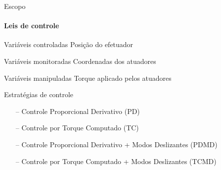 \documentclass[25pt,landscape]{beamer}
\begin{document}
\begin{frame}{Escopo}
    \framesubtitle{Leis de controle}
    \pause
    \begin{block}{Vari\'aveis controladas}
    	Posi\c{c}\~ao do efetuador
    \end{block}
    \pause
    \begin{block}{Vari\'aveis monitoradas}
    	Coordenadas dos atuadores
    \end{block}
    \pause
    \begin{block}{Vari\'aveis manipuladas}
    	Torque aplicado pelos atuadores
    \end{block}
    \pause
   	\begin{block}{Estrat\'egias de controle}
    	\begin{itemize}
    		\item[--] Controle Proporcional Derivativo (PD)
    		\item[--] Controle por Torque Computado (TC)
    		\item[--] Controle Proporcional Derivativo + Modos Deslizantes (PDMD)
    		\item[--] Controle por Torque Computado + Modos Deslizantes (TCMD)
    	\end{itemize}
    \end{block}
\end{frame}

\end{document}
